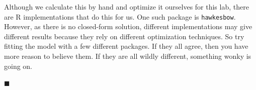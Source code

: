 \documentclass[11pt]{article}
\begin{document}
\begin{enumerate}
\begin{enumerate}
Although we calculate this by hand and optimize it ourselves for this lab, there are R implementations that do this for us. One such package is \texttt{hawkesbow}. However, as there is no closed-form solution, different implementations may give different results because they rely on different optimization techniques. So try fitting the model with a few different packages. If they all agree, then you have more reason to believe them. If they are all wildly different, something wonky is going on.

\end{enumerate}

\hfill $\blacksquare$


\end{enumerate}
\end{document}
